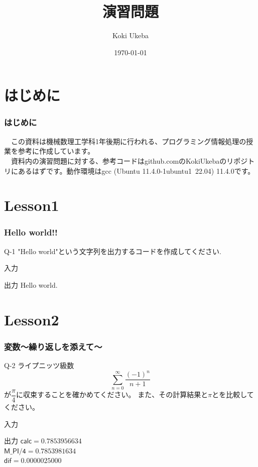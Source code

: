 \documentclass[dvipdfmx]{beamer}
\title{演習問題}
\author{Koki Ukeba}
\date{\today}
\begin{document}
\maketitle
\tableofcontents

\section{はじめに}
\begin{frame}
	\frametitle{はじめに}
	　この資料は機械数理工学科1年後期に行われる、プログラミング情報処理の授業を参考に作成しています。\\
	　資料内の演習問題に対する、参考コードはgithub.comのKokiUkebaのリポジトリにあるはずです。動作環境はgcc (Ubuntu 11.4.0-1ubuntu1~22.04) 11.4.0です。
\end{frame}

\section{Lesson1}
\begin{frame}
	\frametitle{Hello world!!}
	\begin{itembox}[l]{Q-1}
		"Hello world"という文字列を出力するコードを作成してください.
	\end{itembox}
	\begin{block}{入力}
	\end{block}
	\begin{block}{出力}
		Hello world.
	\end{block}
\end{frame}

\section{Lesson2}
\begin{frame}
	\frametitle{変数～繰り返しを添えて～}
	\begin{itembox}[l]{Q-2}
		ライプニッツ級数
		$$\sum_{n=0}^{\infty}\frac{(-1)^n}{n+1}$$
		が$\dfrac{\pi}{4}$に収束することを確かめてください。
		また、その計算結果と$\pi$とを比較してください。
	\end{itembox}
	\begin{block}{入力}
	\end{block}
	\begin{block}{出力}
		$\mathsf{calc = 0.7853956634}$\\
		$\mathsf{M\_PI/4 = 0.7853981634}$\\
		$\mathsf{dif = 0.0000025000}$
	\end{block}
\end{frame}
\end{document}
